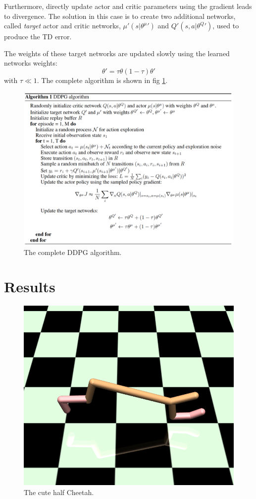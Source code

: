 \documentclass[10pt,a4paper]{scrartcl}
\begin{document}
Furthermore, directly update actor and critic parameters using the gradient leads to divergence. The solution in this case is to create two additional networks, called \textit{target} actor and critic networks, $ \mu{'}(s|\theta^\mu{'}) $ and $ Q{'}(s,a|\theta^Q{'}) $, used to produce the TD error. 

The weights of these target networks are updated slowly using the learned networks weights:
\begin{equation}
	\theta{'} = \tau \theta (1 - \tau)\theta{'}
\end{equation}
with $ \tau \ll 1 $.
The complete algorithm is shown in fig \ref{fig:algo}.

\begin{figure}[h]
	\centering
	\includegraphics[width=0.8\linewidth]{images/algo}
	\caption{The complete DDPG algorithm.}
	\label{fig:algo}
\end{figure}
 

\section{Results}

\begin{figure}[h]
	\centering
	\includegraphics[width=0.5\linewidth]{images/cheetah}
	\caption{The cute half Cheetah.}
	\label{fig:cheetah}
\end{figure}
\end{document}
